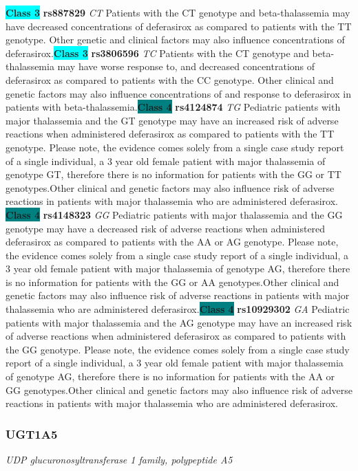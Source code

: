 \documentclass{report}
\begin{document}
\textbf{\colorbox{cyan} {Class 3}} \textbf{ rs887829 } \textit{ CT }
Patients with the CT genotype and beta-thalassemia may have decreased concentrations of deferasirox as compared to patients with the TT genotype. Other genetic and clinical factors may also influence concentrations of deferasirox.\newline\textbf{\colorbox{cyan} {Class 3}} \textbf{ rs3806596 } \textit{ TC }
Patients with the CT genotype and beta-thalassemia may have worse response to, and decreased concentrations of deferasirox as compared to patients with the CC genotype. Other clinical and genetic factors may also influence concentrations of and response to deferasirox in patients with beta-thalassemia.\newline\textbf{\colorbox{teal} {Class 4}} \textbf{ rs4124874 } \textit{ TG }
Pediatric patients with major thalassemia and the GT genotype may have an increased risk of adverse reactions when administered deferasirox as compared to patients with the TT genotype. Please note, the evidence comes solely from a single case study report of a single individual, a 3 year old female patient with major thalassemia of genotype GT, therefore there is no information for patients with the GG or TT genotypes.Other clinical and genetic factors may also influence risk of adverse reactions in patients with major thalassemia who are administered deferasirox. \newline\textbf{\colorbox{teal} {Class 4}} \textbf{ rs4148323 } \textit{ GG }
Pediatric patients with major thalassemia and the GG genotype may have a decreased risk of adverse reactions when administered deferasirox as compared to patients with the AA or AG genotype. Please note, the evidence comes solely from a single case study report of a single individual, a 3 year old female patient with major thalassemia of genotype AG, therefore there is no information for patients with the GG or AA genotypes.Other clinical and genetic factors may also influence risk of adverse reactions in patients with major thalassemia who are administered deferasirox.\newline\textbf{\colorbox{teal} {Class 4}} \textbf{ rs10929302 } \textit{ GA }
Pediatric patients with major thalassemia and the AG genotype may have an increased risk of adverse reactions when administered deferasirox as compared to patients with the GG genotype. Please note, the evidence comes solely from a single case study report of a single individual, a 3 year old female patient with major thalassemia of genotype AG, therefore there is no information for patients with the AA or GG genotypes.Other clinical and genetic factors may also influence risk of adverse reactions in patients with major thalassemia who are administered deferasirox.\newline\subsubsection{ UGT1A5 }
\textit{ UDP glucuronosyltransferase 1 family, polypeptide A5 }
\end{document}
